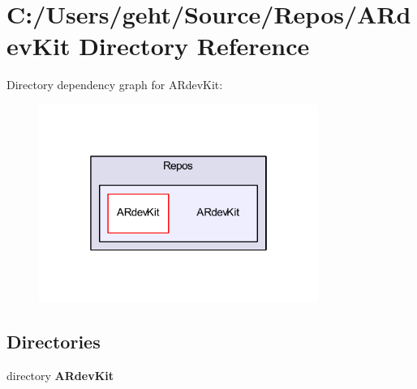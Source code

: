 \section{C\-:/\-Users/geht/\-Source/\-Repos/\-A\-Rdev\-Kit Directory Reference}
\label{dir_83f962f07bcce43db811072021c92c94}
Directory dependency graph for A\-Rdev\-Kit\-:
\nopagebreak
\begin{figure}[H]
\begin{center}
\leavevmode
\includegraphics[width=258pt]{dir_83f962f07bcce43db811072021c92c94_dep}
\end{center}
\end{figure}
\subsection*{Directories}
\begin{DoxyCompactItemize}
\item 
directory {\bf A\-Rdev\-Kit}
\end{DoxyCompactItemize}
